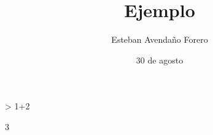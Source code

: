 \documentclass[letterpaper, 12pt]{article}
\title{Ejemplo}
\author{Esteban Avendaño Forero}
\date{30 de agosto}
\begin{document}

\maketitle

\begin{Schunk}
\begin{Sinput}
> 1+2
\end{Sinput}
\begin{Soutput}
[1] 3
\end{Soutput}
\end{Schunk}
\end{document}
